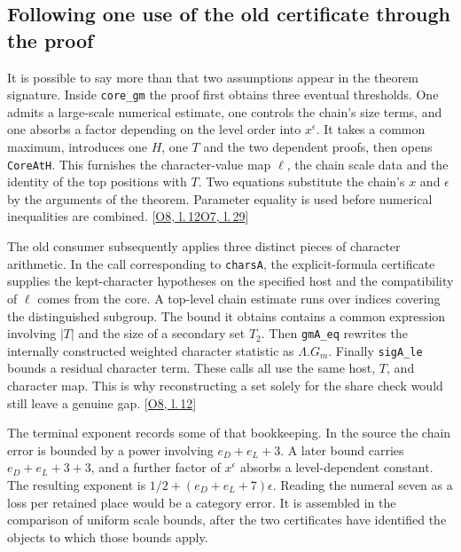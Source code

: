 \documentclass[12pt,letterpaper]{article}
\newcommand{\id}[1]{{\small\nolinkurl{#1}}}
\begin{document}
\subsection{Following one use of the old certificate through the proof}
It is possible to say more than that two assumptions appear in the theorem signature. Inside \id{core_gm} the proof first obtains three eventual thresholds. One admits a large-scale numerical estimate, one controls the chain's size terms, and one absorbs a factor depending on the level order into $x^\epsilon$. It takes a common maximum, introduces one $H$, one $T$ and the two dependent proofs, then opens \id{CoreAtH}. This furnishes the character-value map $\ell$, the chain scale data and the identity of the top positions with $T$. Two equations substitute the chain's $x$ and $\epsilon$ by the arguments of the theorem. Parameter equality is used before numerical inequalities are combined.  {\footnotesize\sffamily\color{mute}[\href{https://github.com/nousentllc/riemann-hypothesis/blob/40e56bab026552e089d7afcfeff08d2defb9c005/src/Development/AutomorphicArithmetic/PrimitiveCosets/CoreGm.lean\#L12}{O8, l.\,12}\enspace \href{https://github.com/nousentllc/riemann-hypothesis/blob/40e56bab026552e089d7afcfeff08d2defb9c005/src/Development/AutomorphicArithmetic/PrimitiveCosets/CoreAtH.lean\#L29}{O7, l.\,29}]}

The old consumer subsequently applies three distinct pieces of character arithmetic. In the call corresponding to \id{charsA}, the explicit-formula certificate supplies the kept-character hypotheses on the specified host and the compatibility of $\ell$ comes from the core. A top-level chain estimate runs over indices covering the distinguished subgroup. The bound it obtains contains a common expression involving $|T|$ and the size of a secondary set $T_2$. Then \id{gmA_eq} rewrites the internally constructed weighted character statistic as $\Lambda.G_m$. Finally \id{sigA_le} bounds a residual character term. These calls all use the same host, $T$, and character map. This is why reconstructing a set solely for the share check would still leave a genuine gap.  {\footnotesize\sffamily\color{mute}[\href{https://github.com/nousentllc/riemann-hypothesis/blob/40e56bab026552e089d7afcfeff08d2defb9c005/src/Development/AutomorphicArithmetic/PrimitiveCosets/CoreGm.lean\#L12}{O8, l.\,12}]}

The terminal exponent records some of that bookkeeping. In the source the chain error is bounded by a power involving $e_D+e_L+3$. A later bound carries $e_D+e_L+3+3$, and a further factor of $x^\epsilon$ absorbs a level-dependent constant. The resulting exponent is $1/2+(e_D+e_L+7)\epsilon$. Reading the numeral seven as a loss per retained place would be a category error. It is assembled in the comparison of uniform scale bounds, after the two certificates have identified the objects to which those bounds apply.
\end{document}
